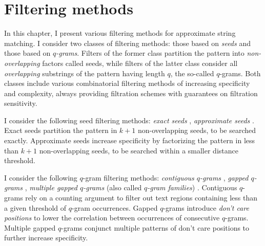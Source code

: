 \chapter{Filtering methods}
\label{sec:filter}

In this chapter, I present various filtering methods for approximate string matching.
I consider two classes of filtering methods: those based on \emph{seeds} and those based on \emph{$q$-grams}.
Filters of the former class partition the pattern into \emph{non-overlapping} factors called seeds, while filters of the latter class consider all \emph{overlapping} substrings of the pattern having length $q$, the so-called $q$-grams.
Both classes include various combinatorial filtering methods of increasing specificity and complexity, always providing filtration schemes with guarantees on filtration sensitivity.

I consider the following seed filtering methods:
\emph{exact seeds} \citep{Baeza1992},
\emph{approximate seeds} \citep{Myers1994,Navarro2000}.
Exact seeds partition the pattern in $k+1$ non-overlapping seeds, to be searched exactly.
Approximate seeds increase specificity by factorizing the pattern in less than $k+1$ non-overlapping seeds, to be searched within a smaller distance threshold.

I consider the following $q$-gram filtering methods:
\emph{contiguous $q$-grams} \citep{Jokinen1991},
\emph{gapped $q$-grams} \citep{Burkhardt2001},
\emph{multiple gapped $q$-grams} (also called \emph{$q$-gram families}) \citep{Kucherov2005}.
Contiguous $q$-grams rely on a counting argument to filter out text regions containing less than a given threshold of $q$-gram occurrences.
Gapped $q$-grams introduce \emph{don't care positions} to lower the correlation between occurrences of consecutive $q$-grams.
Multiple gapped $q$-grams conjunct multiple patterns of don't care positions to further increase specificity.

